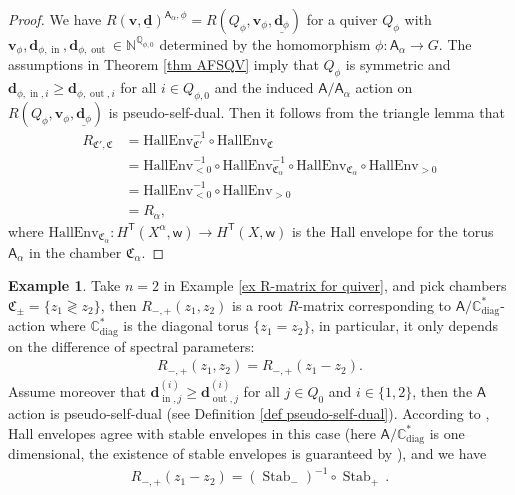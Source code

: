 \documentclass[10pt]{amsart}
\theoremstyle{definition}
\newtheorem{Example}[Theorem]{Example}
\numberwithin{equation}{section}
\newcommand{\HallEnv}{\mathrm{HallEnv}}
\newcommand{\bC}{\mathbb{C}}
\newcommand{\bN}{\mathbb{N}}
\newcommand{\bQ}{\mathbb{Q}}
\newcommand{\bv}{\mathbf{v}}
\newcommand{\bd}{\mathbf{d}}
\newcommand{\fC}{\mathfrak{C}}
\newcommand{\sA}{\mathsf{A}}
\newcommand{\sT}{\mathsf{T}}
\newcommand{\sw}{\mathsf{w}}
\newcommand{\Stab}{\operatorname{Stab}}
\newcommand{\In}{\operatorname{in}}
\newcommand{\Out}{\operatorname{out}}
\begin{document}
\begin{proof}
We have $R(\bv,\underline{\bd})^{\sA_\alpha,\phi}=R(Q_\phi,\bv_\phi,\underline{\bd_\phi})$ for a quiver $Q_\phi$ with $\bv_\phi,\bd_{\phi,\In},\bd_{\phi,\Out}\in \bN^{\bQ_{\phi,0}}$ determined by the homomorphism $\phi\colon \sA_\alpha\to G$. The assumptions in Theorem \ref{thm AFSQV} imply that $Q_\phi$ is symmetric and  $\bd_{\phi,\In,i}\geqslant\bd_{\phi,\Out,i}$ for all $i\in Q_{\phi,0}$ and the induced $\sA/\sA_\alpha$ action on $R(Q_\phi,\bv_\phi,\underline{\bd_\phi})$ is pseudo-self-dual. Then it follows from the triangle lemma  that 
\begin{align*}
    R_{\fC',\fC}&=\HallEnv_{\fC'}^{-1}\circ \HallEnv_{\fC}\\
    &=\HallEnv_{<0}^{-1}\circ \HallEnv_{\fC_\alpha}^{-1}\circ \HallEnv_{\fC_\alpha}\circ \HallEnv_{>0}\\
    &=\HallEnv_{<0}^{-1}\circ  \HallEnv_{>0}\\
    &=R_\alpha,
\end{align*}
where $\HallEnv_{\fC_\alpha}\colon H^\sT(X^{\alpha},\sw )\to H^\sT(X,\sw)$ is the Hall envelope for the torus $\sA_\alpha$ in the chamber $\fC_\alpha$.
\end{proof}

\begin{Example}\label{ex root R-matrix}
Take $n=2$ in Example \ref{ex R-matrix for quiver}, and pick chambers $\fC_\pm=\{z_1\gtrless z_2\}$, then $R_{-,+}(z_1,z_2)$ is a root $R$-matrix corresponding to $\sA/\bC^*_{\mathrm{diag}}$-action where $\bC^*_{\mathrm{diag}}$ is the diagonal torus $\{z_1=z_2\}$, in particular, it only depends on the difference of spectral parameters:
\begin{align*}
    R_{-,+}(z_1,z_2)=R_{-,+}(z_1-z_2).
\end{align*}
Assume moreover that $\bd^{(i)}_{\In,j}\geqslant \bd^{(i)}_{\Out,j}$ for all $j\in Q_0$ and $i\in \{1,2\}$, then the $\sA$ action is pseudo-self-dual (see Definition \ref{def pseudo-self-dual}). According to \cite[Prop.~9.23]{COZZ}, Hall envelopes agree with stable envelopes in this case (here $\sA/\bC^*_{\mathrm{diag}}$ is one dimensional, the existence of stable envelopes is guaranteed by \cite[Prop.~3.23]{COZZ}), and we have
\begin{align*}
 R_{-,+}(z_1-z_2)=(\Stab_{-})^{-1}\circ \Stab_+\,.
\end{align*}
\end{Example}
\end{document}
